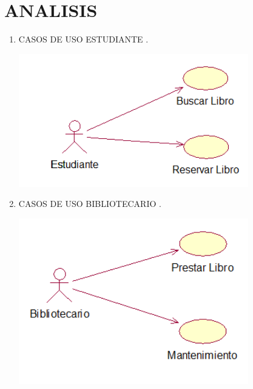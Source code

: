 \section{ANALISIS} 

\begin{enumerate}[1.]
	\item CASOS DE USO ESTUDIANTE .\\
	
    


	\begin{center}
	
	\includegraphics[width=10cm]{./Imagenes/img1} 
	\end{center}
	\item CASOS DE USO BIBLIOTECARIO .\\
	\begin{center}
	\includegraphics[width=10cm]{./Imagenes/img2} 
	\end{center}
\end{enumerate} 
